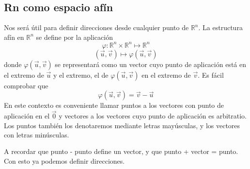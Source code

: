 \documentclass{../Calculo.tex}
\begin{document}
\subsection{Rn como espacio afín}
Nos será útil para definir direcciones desde cualquier punto de $\mathbb{R}^{n}$.
La estructura afín en $\mathbb{R}^{n}$ se define por la aplicación
\[
	\varphi: \mathbb{R}^{n} \times \mathbb{R}^{n} \mapsto \mathbb{R}^{n}
\]
\[
	(\vec{u}, \vec{v}) \mapsto \varphi(\vec{u}, \vec{v})
\]
donde $\varphi(\vec{u}, \vec{v})$ se representará como un vector cuyo punto
de aplicación está en el extremo de $\vec{u}$ y el extremo, el de $\varphi(
\vec{u}, \vec{v})$ en el extremo de $\vec{v}$. Es fácil comprobar que
\[
	\varphi(\vec{u},\vec{v}) = \vec{v} - \vec{u}
\]
En este contexto es conveniente llamar puntos a los vectores con punto de
aplicación en el $\vec{0}$ y vectores a los vectores cuyo punto de aplicación
es arbitratio. Los puntos también los denotaremos mediante letras mayúsculas,
y los vectores con letras minúsculas.
\begin{center}
	


\end{center}
A recordar que punto - punto define un vector, y que punto + vector = punto.
Con esto ya podemos definir direcciones.
\end{document}
